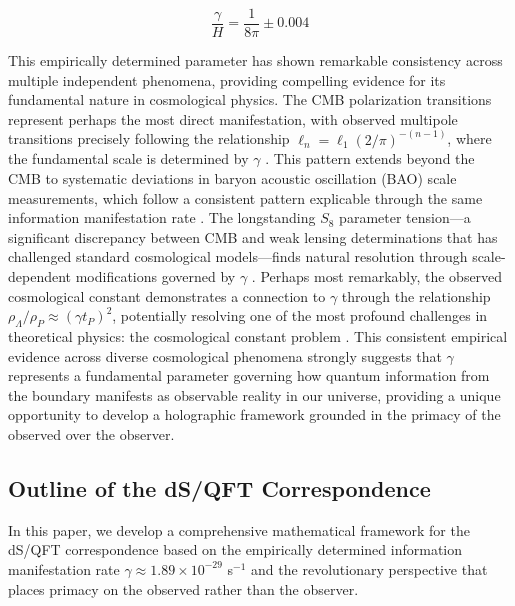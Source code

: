 \documentclass[11pt,english,twoside]{article}
\theoremstyle{plain}
\theoremstyle{definition}
\theoremstyle{remark}
\newcommand{\gammaR}{\gamma}
\begin{document}
\begin{equation}
\label{eq:gamma_H}
\frac{\gammaR}{H} = \frac{1}{8\pi} \pm 0.004
\end{equation}

This empirically determined parameter has shown remarkable consistency across multiple independent phenomena, providing compelling evidence for its fundamental nature in cosmological physics. The CMB polarization transitions represent perhaps the most direct manifestation, with observed multipole transitions precisely following the relationship $\ell_n = \ell_1(2/\pi)^{-(n-1)}$, where the fundamental scale is determined by $\gammaR$ \cite{Weiner2024}. This pattern extends beyond the CMB to systematic deviations in baryon acoustic oscillation (BAO) scale measurements, which follow a consistent pattern explicable through the same information manifestation rate \cite{Weiner2025}. The longstanding $S_8$ parameter tension—a significant discrepancy between CMB and weak lensing determinations that has challenged standard cosmological models—finds natural resolution through scale-dependent modifications governed by $\gammaR$ \cite{Weiner2025}. Perhaps most remarkably, the observed cosmological constant demonstrates a connection to $\gammaR$ through the relationship $\rho_\Lambda/\rho_P \approx (\gammaR t_P)^2$, potentially resolving one of the most profound challenges in theoretical physics: the cosmological constant problem \cite{Weiner2024a}. This consistent empirical evidence across diverse cosmological phenomena strongly suggests that $\gammaR$ represents a fundamental parameter governing how quantum information from the boundary manifests as observable reality in our universe, providing a unique opportunity to develop a holographic framework grounded in the primacy of the observed over the observer.

\subsection{Outline of the dS/QFT Correspondence}
\label{subsec:outline}

In this paper, we develop a comprehensive mathematical framework for the dS/QFT correspondence based on the empirically determined information manifestation rate $\gammaR \approx 1.89 \times 10^{-29}$ s$^{-1}$ and the revolutionary perspective that places primacy on the observed rather than the observer. 
\end{document}

